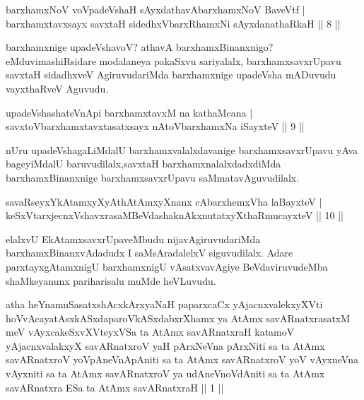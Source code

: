 \begin{shl}
barxhamxNoV voVpadeVshaH sAyxdathavA\s barxhamxNoV BaveVtf |\\
barxhamxtavxsayx savxtaH sidedhxVbarxRhamxNi sAyxdanathaRkaH \hfill || 8 ||
\end{shl}

\begin{artha}
barxhamxnige upadeVshavoV? athavA barxhamxBinanxnigo? eMdu\break vimashiRsidare modalaneya pakaSxvu sariyalalx, barxhamxsavxrUpavu savxtaH sidadhxveV AgiruvudariMda barxhamxnige upadeVsha mADuvudu vayxthaRveV Aguvudu.
\end{artha}


\begin{shl}
upadeVshashateVnApi barxhamxtavxM na kathaMcana |\\
savxtoV\s barxhamxtavxtasatxsayx nAtoV\s barxhamxNa iSayxteV \hfill || 9 ||
\end{shl}

\begin{artha}
nUru upadeVshagaLiMdalU barxhamxvalalxdavanige barxhamxsavxrUpavu yAva bageyiMdalU baruvudilalx,savxtaH barxhamxnalalxdadxdiMda barxhamxBinanxnige barxhamxsavxrUpavu saMmatavAguvudilalx.
\end{artha}

\begin{shl}
savaRseyxYkAtamxyXyAthAtAmxyXnanx cAbarxhemxVha laBayxteV |\\
keSxVtarxjecnxVshavxrasaMBeVdashaknAkxnutatxyXthaRmucayxteV \hfill || 10 ||
\end{shl}

\begin{artha}
elalxvU EkAtamxsavxrUpaveMbudu nijavAgiruvudariMda barxhamxBinanxvAdadudx I saMsAradalelxV siguvudilalx. Adare parxtayxgAtamxnigU barxhamxnigU vAsatxvavAgiye BeVdaviruvudeMba shaMkeyanunx pariharisalu muMde heVLuvudu.
\end{artha}


\begin{kandikeshl}
atha heYnamuSasatxshAcxkArxyaNaH paparxcaCx yAjacnxvalekxyXVti hoVvAca\break yatAsxkASxdaparoVkASxdabxrXhamx ya AtAmx savARnatxrasatxM meV vAyxcakeSxvXVteyxVSa ta AtAmx savARnatxraH katamoV yAjacnxvalakxyX savARnatxroV yaH pArxNeVna pArxNiti sa ta AtAmx savARnatxroV yoV\s pAneVnApAniti sa ta AtAmx savARnatxroV yoV vAyxneVna vAyxniti sa ta AtAmx savARnatxroV ya udAneVnoVdAniti sa ta AtAmx savARnatxra ESa ta AtAmx savARnatxraH || 1 ||
\end{kandikeshl}

